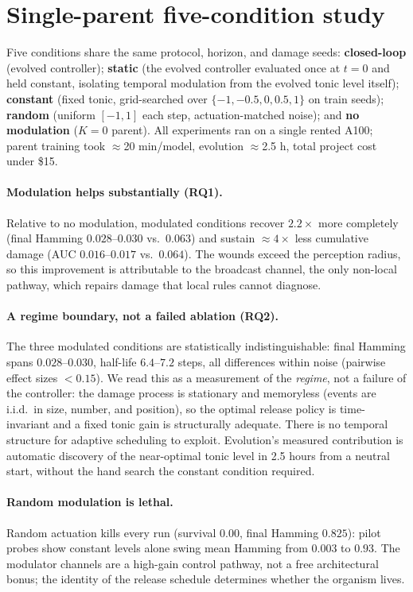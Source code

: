 \documentclass{article}
\begin{document}
\section{Single-parent five-condition study}
\label{app:singleparent}

Five conditions share the same protocol, horizon, and damage seeds:
\textbf{closed-loop} (evolved controller); \textbf{static} (the evolved
controller evaluated once at $t{=}0$ and held constant, isolating temporal
modulation from the evolved tonic level itself); \textbf{constant}
(fixed tonic, grid-searched over $\{-1,-0.5,0,0.5,1\}$ on train seeds);
\textbf{random} (uniform $[-1,1]$ each step, actuation-matched noise); and
\textbf{no modulation} ($K{=}0$ parent). All experiments ran on a single
rented A100; parent training took $\approx$20 min/model, evolution
$\approx$2.5 h, total project cost under \$15.

\paragraph{Modulation helps substantially (RQ1).}
Relative to no modulation, modulated conditions recover $2.2\times$ more
completely (final Hamming $0.028$--$0.030$ vs.\ $0.063$) and sustain
$\approx 4\times$ less cumulative damage (AUC $0.016$--$0.017$ vs.\ $0.064$).
The wounds exceed the perception radius, so this improvement is attributable
to the broadcast channel, the only non-local pathway, which repairs damage
that local rules cannot diagnose.

\paragraph{A regime boundary, not a failed ablation (RQ2).}
The three modulated conditions are statistically indistinguishable: final
Hamming spans $0.028$--$0.030$, half-life $6.4$--$7.2$ steps, all differences
within noise (pairwise effect sizes $< 0.15$). We read this as a measurement
of the \emph{regime}, not a failure of the controller: the damage process is stationary and memoryless (events are i.i.d.\ in
size, number, and position), so the optimal release policy is time-invariant and a fixed
tonic gain is structurally adequate. There is no temporal structure for
adaptive scheduling to exploit. Evolution's measured contribution is
automatic discovery of the near-optimal tonic level in 2.5 hours from a
neutral start, without the hand search the constant condition required.

\paragraph{Random modulation is lethal.}
Random actuation kills every run (survival $0.00$, final Hamming $0.825$):
pilot probes show constant levels alone swing mean Hamming from $0.003$ to
$0.93$. The modulator channels are a high-gain control pathway, not a free architectural bonus; the
identity of the release schedule determines
whether the organism lives.
\end{document}
